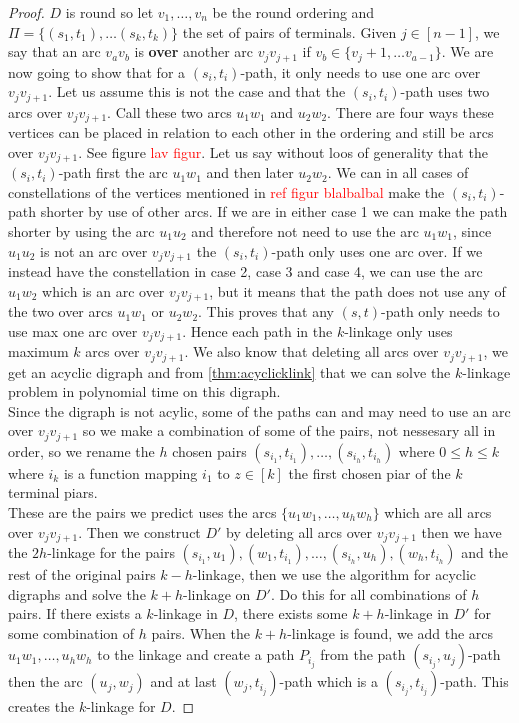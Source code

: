 \begin{proof}
    $D$ is round so let $v_1,\dots ,v_n$ be the round ordering and $\Pi = \lbrace (s_1,t_1), \dots (s_k,t_k)\rbrace$ the set of pairs of terminals.
    Given $j\in [n-1]$, we say that an arc $v_av_b$ is \textbf{over} another arc $v_jv_{j+1}$ if $v_b\in \lbrace v_j+1,\dots v_{a-1}\rbrace$. 
    We are now going to show that for a $(s_i,t_i)$-path, it only needs to use one arc over $v_jv_{j+1}$. 
    Let us assume this is not the case and that the $(s_i,t_i)$-path uses two arcs over $v_jv_{j+1}$. 
    Call these two arcs $u_1w_1$ and $u_2w_2$. 
    There are four ways these vertices can be placed in relation to each other in the ordering and still be arcs over $v_jv_{j+1}$. See figure \textcolor{red}{lav figur}.
    Let us say without loos of generality that the $(s_i,t_i)$-path first the arc $u_1w_1$ and then later $u_2w_2$.
    We can in all cases of constellations of the vertices mentioned in \textcolor{red}{ref figur blalbalbal} make the $(s_i,t_i)$-path shorter by use of other arcs. 
    If we are in either case 1 we can make the path shorter by using the arc $u_1u_2$ and therefore not need to use the arc $u_1w_1$, since $u_1u_2$ is not an arc over $v_jv_{j+1}$ the $(s_i,t_i)$-path only uses one arc over.
    If we instead have the constellation in case 2, case 3 and case 4, we can use the arc $u_1w_2$ which is an arc over $v_jv_{j+1}$, but it means that the path does not use any of the two over arcs $u_1w_1$ or $u_2w_2$. 
    This proves that any $(s,t)$-path only needs to use max one arc over $v_jv_{j+1}$.
    Hence each path in the $k$-linkage only uses maximum $k$ arcs over $v_jv_{j+1}$.
    We also know that deleting all arcs over $v_jv_{j+1}$, we get an acyclic digraph and from \autoref{thm:acyclicklink} that we can solve the $k$-linkage problem in polynomial time on this digraph.\\
    Since the digraph is not acylic, some of the paths can and may need to use an arc over $v_jv_{j+1}$ so we make a combination of some of the pairs, not nessesary all in order, so we rename the $h$ chosen pairs $(s_{i_1},t_{i_1}),\dots ,(s_{i_h},t_{i_h})$ where $0\leq h\leq k$ where $i_k$ is a function mapping $i_1$ to $z\in [k]$ the first chosen piar of the $k$ terminal piars. \\
    These are the pairs we predict uses the arcs $\lbrace u_1w_1,\dots ,u_hw_h\rbrace$ which are all arcs over $v_jv_{j+1}$.
    Then we construct $D'$ by deleting all arcs over $v_jv_{j+1}$ then we have the $2h$-linkage for the pairs $(s_{i_1},u_1),(w_1,t_{i_1}),\dots ,(s_{i_h},u_h),(w_h,t_{i_h})$ and the rest of the original pairs $k-h$-linkage, then we use the algorithm for acyclic digraphs and solve the $k+h$-linkage on $D'$. Do this for all combinations of $h$ pairs. 
    If there exists a $k$-linkage in $D$, there exists some $k+h$-linkage in $D'$ for some combination of $h$ pairs.
    When the $k+h$-linkage is found, we add the arcs $u_1w_1,\dots , u_hw_h$ to the linkage and create a path $P_{i_j}$ from the path $(s_{i_j},u_j)$-path then the arc $(u_j,w_j)$ and at last  $(w_j,t_{i_j})$-path which is a $(s_{i_j},t_{i_j})$-path.
    This creates the $k$-linkage for $D$. 
\end{proof}
